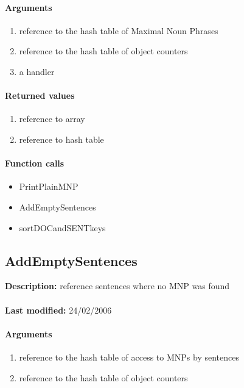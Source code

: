 \paragraph{Arguments}
\begin{enumerate}
\item reference to the hash table of Maximal Noun Phrases
\item reference to the hash table of object counters
\item a handler
\end{enumerate}

\paragraph{Returned values}
\begin{enumerate}
\item reference to array
\item reference to hash table
\end{enumerate}

\paragraph{Function calls}
\begin{itemize}
\item PrintPlainMNP
\item AddEmptySentences
\item sortDOCandSENTkeys
\end{itemize}

\subsection{AddEmptySentences}
\textbf{Description:} reference sentences where no MNP was found\\
\\\textbf{Last modified:} 24/02/2006

\paragraph{Arguments}
\begin{enumerate}
\item reference to the hash table of access to MNPs by sentences
\item reference to the hash table of object counters
\end{enumerate}

